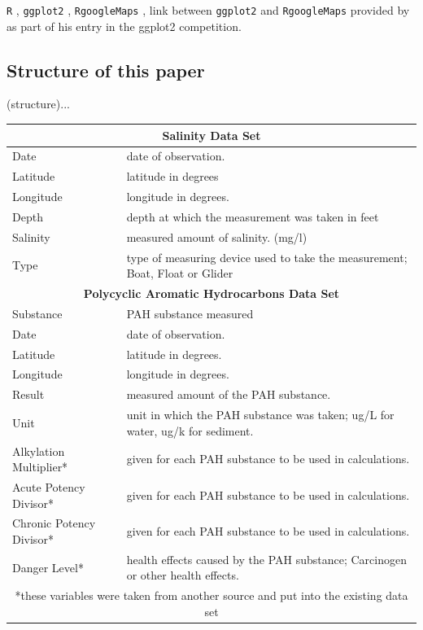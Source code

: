 \documentclass[authoryear,12pt]{elsarticle}
\begin{document}
{\tt R} \citep{R2011}, {\tt ggplot2} \citep{ggplot2}, {\tt RgoogleMaps} \citep{RgoogleMaps}, link between {\tt ggplot2} and {\tt RgoogleMaps} provided by \citet{kahle2010} as part of his entry in the ggplot2 competition.

\subsection{Structure of this paper}
(structure)...
\begin{center}
\begin{tabular}{| l | p{11cm} | }
\hline
\multicolumn{2}{|c|}{{\bf Salinity Data Set}} \\ \hline
Date & date of observation. \\ \hline
Latitude & latitude in degrees \\ \hline
Longitude & longitude in degrees. \\ \hline
Depth & depth at which the measurement was taken in feet \\ \hline
Salinity &  measured amount of salinity. (mg/l) \\ \hline
Type &  type of measuring device used to take the measurement; Boat, Float or Glider \\ \hline
\multicolumn{2}{|c|}{{\bf Polycyclic Aromatic Hydrocarbons Data Set}} \\ \hline
Substance & PAH substance measured \\ \hline
Date & date of observation.\\ \hline
Latitude & latitude in degrees. \\ \hline
Longitude & longitude in degrees. \\ \hline
Result &  measured amount of the PAH substance. \\ \hline
Unit &  unit in which the PAH substance was taken; ug/L for water, ug/k for sediment. \\ \hline
Alkylation Multiplier* & given for each PAH substance to be used in calculations. \\ \hline
Acute Potency Divisor* &  given for each PAH substance to be used in calculations. \\ \hline
Chronic Potency Divisor* &  given for each PAH substance to be used in calculations. \\ \hline
Danger Level* &  health effects caused by the PAH substance; Carcinogen or other health effects. \\ \hline
\multicolumn{2}{|c|}{*these variables were taken from another source and put into the existing data set} \\ \hline
\end{tabular}
\end{center}
\end{document}
